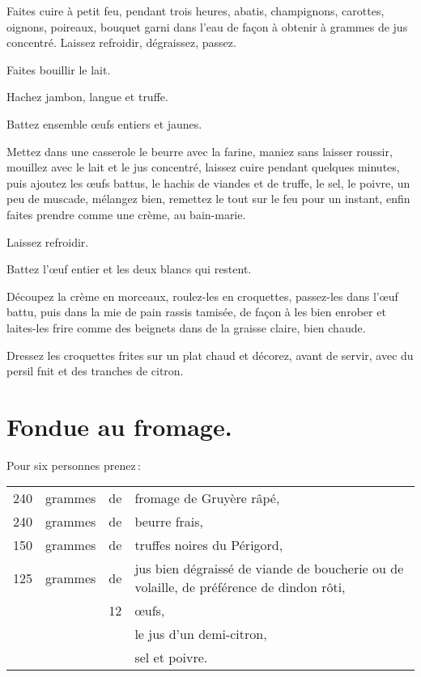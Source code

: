Faites cuire à petit feu, pendant trois heures, abatis, champignons, carottes,
oignons, poireaux, bouquet garni dans l'eau de façon à obtenir {\mmm}
à {\mmm} grammes de jus concentré. Laissez refroidir, dégraissez,
passez.

Faites bouillir le lait.

Hachez jambon, langue et truffe.

Battez ensemble {\mmm} œufs entiers et {\mmm} jaunes.

Mettez dans une casserole le beurre avec la farine, maniez sans laisser
roussir, mouillez avec le lait et le jus concentré, laissez cuire pendant
quelques minutes, puis ajoutez les œufs battus, le hachis de viandes et de
truffe, le sel, le poivre, un peu de muscade, mélangez bien, remettez le tout
sur le feu pour un instant, enfin faites prendre comme une crème, au
bain-marie.

Laissez refroidir.

Battez l'œuf entier et les deux blancs qui restent.

Découpez la crème en morceaux, roulez-les en croquettes, passez-les dans l'œuf
battu, puis dans la mie de pain rassis tamisée, de façon à les bien enrober et
laites-les frire comme des beignets dans de la graisse claire, bien chaude.

Dressez les croquettes frites sur un plat chaud et décorez, avant de servir, avec
du persil fnit et des tranches de citron.

\section*{\centering Fondue au fromage.}

Pour six personnes prenez :

\medskip

\footnotesize
\begin{longtable}{rrrp{16em}}
  240 & grammes & de & fromage de Gruyère râpé,                                                           \\
  240 & grammes & de & beurre frais,                                                                      \\
  150 & grammes & de & truffes noires du Périgord,                                                        \\
  125 & grammes & de & jus bien dégraissé de viande de boucherie
                       ou de volaille, de préférence de dindon rôti,                                      \\
      &         & 12 & œufs,                                                                              \\
      &         &    & le jus d'un demi-citron,                                                           \\
      &         &    & sel et poivre.                                                                     \\
\end{longtable}
\normalsize

